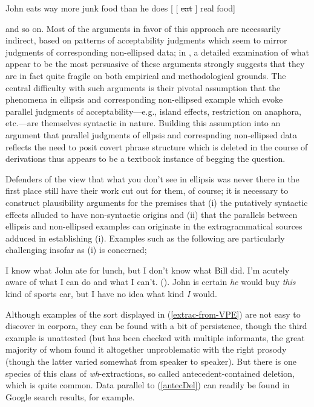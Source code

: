 \documentclass[output=paper,colorlinks,citecolor=brown]{langscibook}
\begin{document}
\begin{exe}
 \ex\label{pseudodeletion}
  John eats way more junk food than he does [ [ \sout{eat} {\gp}\xspace ] real food]
\end{exe}
and so on. Most of the arguments in favor of this approach are
necessarily indirect, based on patterns of acceptability judgments which seem to
mirror judgments of corresponding non-ellipsed data; in \citet{kubotalevineBook}, a
detailed examination of what appear to be the most persuasive of these
arguments strongly suggests that they are in fact quite fragile on
both empirical and methodological grounds. The central difficulty with
such arguments is their pivotal assumption  that
the phenomena in  ellipsis and corresponding non-ellipsed example
which evoke parallel judgments of acceptability---e.g., island effects,
restriction on anaphora, etc.---are themselves syntactic in
nature. Building this assumption into an argument that parallel
judgments of ellpsis and correspnding non-ellipsed data reflects the
need to posit covert phrase structure which is deleted in the course
of derivations thus appears to be a textbook instance of begging the question.

Defenders of the view that what you don't see in ellipsis was never
there in the first place still have their work cut out for them, of
course; it is necessary to construct plausibility arguments for the
premises that (i) the putatively syntactic effects alluded to have
non-syntactic origins and (ii) that the parallels between ellipsis and
non-ellipsed examples can originate in the extragrammatical sources
adduced in establishing (i). Examples such as the following are
particularly challenging insofar as (i) is concerned;


\begin{exe}
 \ex\label{extrac-from-VPE}
  \begin{xlist}
 \ex\label{}
    I know what John ate for lunch,  but I don't know what Bill did.
 \ex\label{}
    I'm acutely aware of what I can do and what I
  can't. (\citet[735]{mahoney2004}).
 \ex\label{}
    John is certain \textsl{he} would buy \textsl{this} kind of sports car, but I have no idea what kind \textsl{I} would.
  \end{xlist}
\end{exe}
Although examples of the sort displayed in (\ref{extrac-from-VPE}) are not
easy to discover in corpora, they can be found with a bit of
persistence, though the third example is unattested (but has been
checked with multiple informants, the great majority of whom found it
altogether unproblematic with the right prosody (though the latter
varied somewhat from speaker to speaker). But there is one species of this class of
\textit{wh}-extractions, so called antecedent-contained deletion,  which is
quite common. Data parallel to (\ref{antecDel}) can readily be found in
Google search results, for example.
\end{document}
